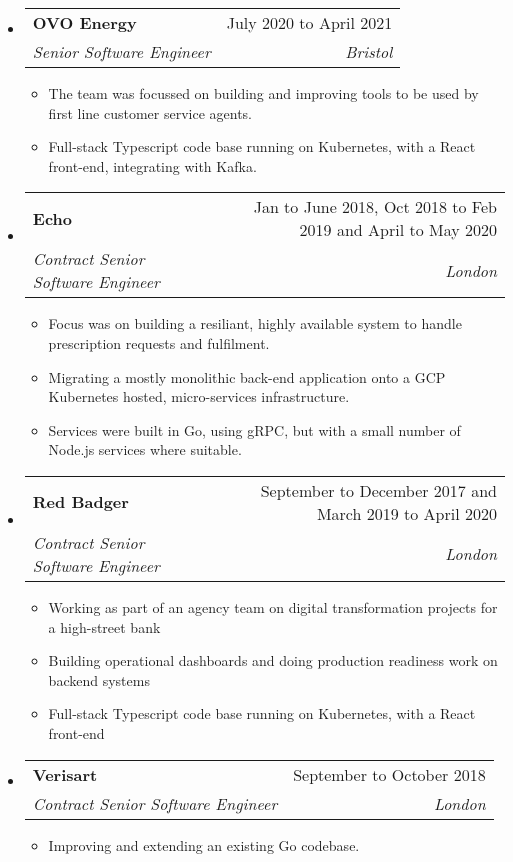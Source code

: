 \documentclass[letterpaper,12pt]{article}[leftmargin=*]
\makeatletter
\def \entryspacing {-0pt}
\newenvironment{resumeEntry}[0]{
  \begin{itemize}[leftmargin=2.5mm]
  }{
  \end{itemize}\vspace{\entryspacing}
}
\newenvironment{resumeItemList}[0]{
  \begin{itemize}[leftmargin=4.5mm]
  }{
  \end{itemize}
}
\newcommand{\resumeItem}[1]{
  \item\small{
    {#1 \vspace{-2pt}}
  }
}
\newcommand{\resumeEntryTSDL}[4]{
  \vspace{-1pt}\item[]
    \begin{tabularx}{0.97\textwidth}{X@{\hspace{60pt}}r}
      \textbf{\color{primary}#1} & {\firabook\color{accent}\small#2} \\
      \textit{\color{accent}\small#3} & \textit{\color{accent}\small#4} \\
    \end{tabularx}\vspace{-6pt}
}
\makeatother
\begin{document}
  \begin{resumeEntry}
    \resumeEntryTSDL{OVO Energy}{July 2020 to April 2021}
      {Senior Software Engineer}{Bristol}
    \begin{resumeItemList}
      \resumeItem{The team was focussed on building and improving tools to be used by first line customer service agents.}
      \resumeItem{Full-stack Typescript code base running on Kubernetes, with a React front-end, integrating with Kafka.}
    \end{resumeItemList}
  \end{resumeEntry}

  \begin{resumeEntry}
    \resumeEntryTSDL{Echo}{Jan to June 2018, Oct 2018 to Feb 2019 and April to May 2020}
      {Contract Senior Software Engineer}{London}
    \begin{resumeItemList}
      \resumeItem{Focus was on building a resiliant, highly available system to handle prescription requests and fulfilment.}
      \resumeItem{Migrating a mostly monolithic back-end application onto a GCP Kubernetes hosted, micro-services infrastructure.}
      \resumeItem{Services were built in Go, using gRPC, but with a small number of Node.js services where suitable.}
    \end{resumeItemList}
  \end{resumeEntry}

  \begin{resumeEntry}
    \resumeEntryTSDL{Red Badger}{September to December 2017 and March 2019 to April 2020}
      {Contract Senior Software Engineer}{London}
    \begin{resumeItemList}
      \resumeItem{Working as part of an agency team on digital transformation projects for a high-street bank}
      \resumeItem{Building operational dashboards and doing production readiness work on backend systems}
      \resumeItem{Full-stack Typescript code base running on Kubernetes, with a React front-end}
    \end{resumeItemList}
  \end{resumeEntry}

  \begin{resumeEntry}
    \resumeEntryTSDL{Verisart}{September to October 2018}
      {Contract Senior Software Engineer}{London}
    \begin{resumeItemList}
      \resumeItem{Improving and extending an existing Go codebase.}
    \end{resumeItemList}
  \end{resumeEntry}
\end{document}
